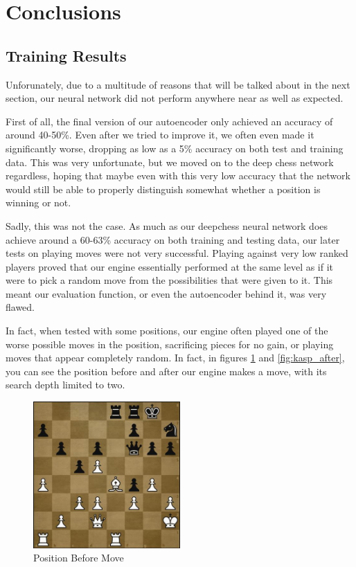 \documentclass[12pt]{article}
\begin{document}
    \section{Conclusions}

    \subsection{Training Results}

    Unforunately, due to a multitude of reasons that will be talked about in the next section, our neural network did not perform anywhere near as well as expected.

    First of all, the final version of our autoencoder only achieved an accuracy of around 40-50\%. Even after we tried to improve it, we often even made it significantly worse, dropping as low as a 5\% accuracy on both test and training data. This was very unfortunate, but we moved on to the deep chess network regardless, hoping that maybe even with this very low accuracy that the network would still be able to properly distinguish somewhat whether a position is winning or not.

    Sadly, this was not the case. As much as our deepchess neural network does achieve around a 60-63\% accuracy on both training and testing data, our later tests on playing moves were not very successful. Playing against very low ranked players proved that our engine essentially performed at the same level as if it were to pick a random move from the possibilities that were given to it. This meant our evaluation function, or even the autoencoder behind it, was very flawed. 

    In fact, when tested with some positions, our engine often played one of the worse possible moves in the position, sacrificing pieces for no gain, or playing moves that appear completely random. In fact, in figures \ref{fig:kasp_before} and \ref{fig:kasp_after}, you can see the position before and after our engine makes a move, with its search depth limited to two.

    \begin{singlespace}
        \begin{figure}[ht]
            \centering
            \caption{Position Before Move}
            \label{fig:kasp_before}
            \includegraphics[width=0.5\textwidth]{kasp_pos_before.jpg}
        \end{figure}
    \end{singlespace}
\end{document}
